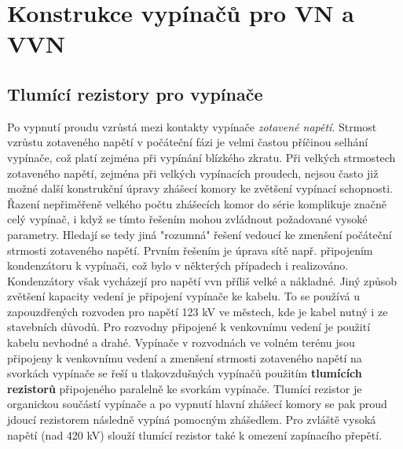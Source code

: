 \chapter{Konstrukce vypínačů pro VN a VVN}
\minitoc

  \section{Tlumící rezistory pro vypínače}
    Po vypnutí proudu vzrůstá mezi kontakty vypínače \emph{zotavené napětí}. Strmost vzrůstu zotaveného napětí v počáteční fázi je velmi častou příčinou selhání vypínače, což platí zejména při vypínání blízkého zkratu. Při velkých strmostech zotaveného napětí, zejména při velkých vypínacích proudech, nejsou často již možné další konstrukční úpravy zhášecí komory ke zvětšení vypínací schopnosti. Řazení nepřiměřeně velkého počtu zhášecích komor do série 
    komplikuje značně celý vypínač, i když se tímto řešením mohou zvládnout požadované vysoké parametry. Hledají se tedy jiná "rozumná" řešení vedoucí ke zmenšení počáteční strmosti zotaveného napětí. Prvním řešením je úprava sítě např. připojením kondenzátoru k vypínači, což bylo v některých případech i realizováno. Kondenzátory však vycházejí pro napětí vvn příliš velké a nákladné. Jiný způsob zvětšení kapacity vedení je připojení vypínače ke kabelu. 
    To se používá u zapouzdřených rozvoden pro napětí 123 kV ve městech, kde je kabel nutný i ze stavebních důvodů. Pro rozvodny připojené k venkovnímu vedení je použití kabelu nevhodné a drahé. Vypínače v rozvodnách ve volném terénu jsou připojeny k venkovnímu vedení a zmenšení strmosti zotaveného napětí na svorkách vypínače se řeší u tlakovzdušných vypínačů použitím \textbf{tlumících rezistorů} připojeného paralelně ke svorkám vypínače. Tlumící rezistor je organickou součástí vypínače a po vypnutí hlavní zhášecí komory se pak proud jdoucí rezistorem následně vypíná pomocným zhášedlem. Pro zvláště vysoká napětí (nad 420 kV) slouží tlumící rezistor také k omezení zapínacího přepětí.

